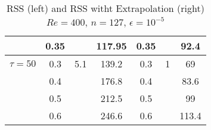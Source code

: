 \documentclass[11pt]{article}
\begin{document}
{\begin{table}[h!]
\begin{center}
\begin{tabular}{|c||c|c|c||c|c|c|}
\hline 
                       & 0.35 &   & 117.95 & 0.35 &   & 92.4\\ 
\hline 
\hline 
  $\tau = 50$      & 0.3 & 5.1  & 139.2& 0.3 &  1 & 69 \\ 
\hline         
                          & 0.4 &   & 176.8& 0.4 &   & 83.6 \\ 
\hline         
                          & 0.5 &   & 212.5& 0.5 &   & 99 \\     
\hline         
                          & 0.6 &   & 246.6& 0.6 &   & 113.4 \\                         
\hline 
\hline
\end{tabular}
\caption{RSS (left) and RSS witht   Extrapolation (right) $Re=400$, $n=127$, $\epsilon=10^{-5}$}
\label{tab2}
\end{center}
\end{table}

}
\end{document}
